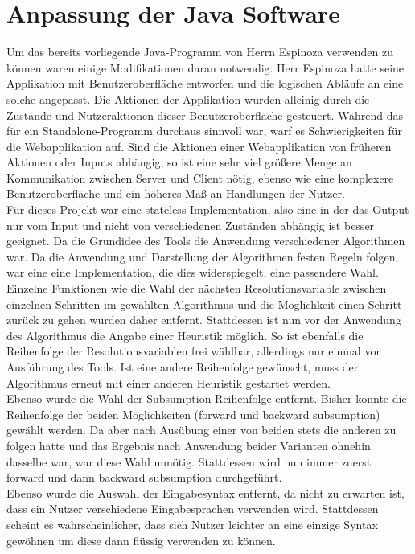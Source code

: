 \section{Anpassung der Java Software}
Um das bereits vorliegende Java-Programm von Herrn Espinoza verwenden zu können waren einige Modifikationen daran notwendig. Herr Espinoza hatte seine Applikation mit Benutzeroberfläche entworfen und die logischen Abläufe an eine solche angepasst. Die Aktionen der Applikation wurden alleinig durch die Zustände und Nutzeraktionen dieser Benutzeroberfläche gesteuert. Während das für ein Standalone-Programm durchaus sinnvoll war, warf es Schwierigkeiten für die Webapplikation auf. Sind die Aktionen einer Webapplikation von früheren Aktionen oder Inputs abhängig, so ist  eine sehr viel größere Menge an Kommunikation zwischen Server und Client nötig, ebenso wie eine komplexere Benutzeroberfläche und ein höheres Maß an Handlungen der Nutzer. \\
Für dieses Projekt war eine stateless Implementation, also eine in der das Output nur vom Input und nicht von verschiedenen Zuständen abhängig ist besser geeignet. Da die Grundidee des Tools die Anwendung verschiedener Algorithmen war. Da die Anwendung und Darstellung der Algorithmen festen Regeln folgen, war eine eine Implementation, die dies widerspiegelt, eine passendere Wahl. \\
Einzelne Funktionen wie die Wahl der nächsten Resolutionsvariable zwischen einzelnen Schritten im gewählten Algorithmus und die Möglichkeit einen Schritt zurück zu gehen wurden daher entfernt. Stattdessen ist nun vor der Anwendung des Algorithmus die Angabe einer Heuristik möglich. So ist ebenfalls die Reihenfolge der Resolutionsvariablen frei wählbar, allerdings nur einmal vor Ausführung des Tools. Ist eine andere Reihenfolge gewünscht, muss der Algorithmus erneut mit einer anderen Heuristik gestartet werden. \\
Ebenso wurde die Wahl der Subsumption-Reihenfolge entfernt. Bisher konnte die Reihenfolge der beiden Möglichkeiten (forward und backward subsumption) gewählt werden. Da aber nach Ausübung einer von beiden stets die anderen zu folgen hatte und das Ergebnis nach Anwendung beider Varianten ohnehin dasselbe war, war diese Wahl unnötig. Stattdessen wird nun immer zuerst forward und dann backward subsumption durchgeführt. \\
Ebenso wurde die Auswahl der Eingabesyntax entfernt, da nicht zu erwarten ist, dass ein Nutzer verschiedene Eingabesprachen verwenden wird. Stattdessen scheint es wahrscheinlicher, dass sich Nutzer leichter an eine einzige Syntax gewöhnen um diese dann flüssig verwenden zu können.\\
